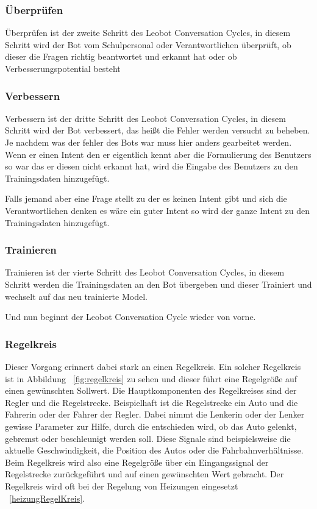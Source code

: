 \subsubsection{Überprüfen}

Überprüfen ist der zweite Schritt des Leobot Conversation Cycles, in diesem Schritt wird der Bot vom Schulpersonal oder Verantwortlichen überprüft, ob dieser die Fragen richtig beantwortet und erkannt hat oder ob Verbesserungspotential besteht

\subsubsection{Verbessern}
Verbessern ist der dritte Schritt des Leobot Conversation Cycles, in diesem Schritt wird der Bot verbessert, das heißt die Fehler werden versucht zu beheben.
Je nachdem was der fehler des Bots war muss hier anders gearbeitet werden.
Wenn er einen Intent den er eigentlich kennt aber die Formulierung des Benutzers so war das er diesen nicht erkannt hat, wird die Eingabe des Benutzers zu den Trainingsdaten hinzugefügt.

Falls jemand aber eine Frage stellt zu der es keinen Intent gibt und sich die Verantwortlichen denken es wäre ein guter Intent so wird der ganze Intent zu den Trainingsdaten hinzugefügt.

\subsubsection{Trainieren}
Trainieren ist der vierte Schritt des Leobot Conversation Cycles, in diesem Schritt werden die Trainingsdaten an den Bot übergeben und dieser Trainiert und wechselt auf das neu trainierte Model.

Und nun beginnt der Leobot Conversation Cycle wieder von vorne.

\subsubsection{Regelkreis}

Dieser Vorgang erinnert dabei stark an einen Regelkreis.
Ein solcher Regelkreis ist in Abbildung ~\ref{fig:regelkreis} zu sehen und dieser führt eine Regelgröße auf einen gewünschten Sollwert.
Die Hauptkomponenten des Regelkreises sind der Regler und die Regelstrecke.
Beispielhaft ist die Regelstrecke ein Auto und die Fahrerin oder der Fahrer der Regler.
Dabei nimmt die Lenkerin oder der Lenker gewisse Parameter zur Hilfe, durch die entschieden wird, ob das Auto gelenkt, gebremst oder beschleunigt werden soll.
Diese Signale sind beispielsweise die aktuelle Geschwindigkeit, die Position des Autos oder die Fahrbahnverhältnisse.
Beim Regelkreis wird also eine Regelgröße über ein Eingangssignal der Regelstrecke zurückgeführt und auf einen gewünschten Wert gebracht.
Der Regelkreis wird oft bei der Regelung von Heizungen eingesetzt ~\ref{heizungRegelKreis}.\cite{regelkreis, regelkreisBeispiel}

